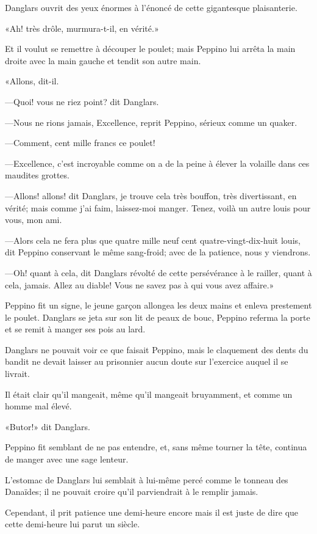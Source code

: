 Danglars ouvrit des yeux énormes à l'énoncé de cette gigantesque plaisanterie. 

«Ah! très drôle, murmura-t-il, en vérité.» 

Et il voulut se remettre à découper le poulet; mais Peppino lui arrêta la main droite avec la main gauche et tendit son autre main. 

«Allons, dit-il. 

—Quoi! vous ne riez point? dit Danglars. 

—Nous ne rions jamais, Excellence, reprit Peppino, sérieux comme un quaker. 

—Comment, cent mille francs ce poulet! 

—Excellence, c'est incroyable comme on a de la peine à élever la volaille dans ces maudites grottes. 

—Allons! allons! dit Danglars, je trouve cela très bouffon, très divertissant, en vérité; mais comme j'ai faim, laissez-moi manger. Tenez, voilà un autre louis pour vous, mon ami. 

—Alors cela ne fera plus que quatre mille neuf cent quatre-vingt-dix-huit louis, dit Peppino conservant le même sang-froid; avec de la patience, nous y viendrons. 

—Oh! quant à cela, dit Danglars révolté de cette persévérance à le railler, quant à cela, jamais. Allez au diable! Vous ne savez pas à qui vous avez affaire.» 

Peppino fit un signe, le jeune garçon allongea les deux mains et enleva prestement le poulet. Danglars se jeta sur son lit de peaux de bouc, Peppino referma la porte et se remit à manger ses pois au lard. 

Danglars ne pouvait voir ce que faisait Peppino, mais le claquement des dents du bandit ne devait laisser au prisonnier aucun doute sur l'exercice auquel il se livrait. 

Il était clair qu'il mangeait, même qu'il mangeait bruyamment, et comme un homme mal élevé. 

«Butor!» dit Danglars. 

Peppino fit semblant de ne pas entendre, et, sans même tourner la tête, continua de manger avec une sage lenteur. 

L'estomac de Danglars lui semblait à lui-même percé comme le tonneau des Danaïdes; il ne pouvait croire qu'il parviendrait à le remplir jamais. 

Cependant, il prit patience une demi-heure encore mais il est juste de dire que cette demi-heure lui parut un siècle. 

